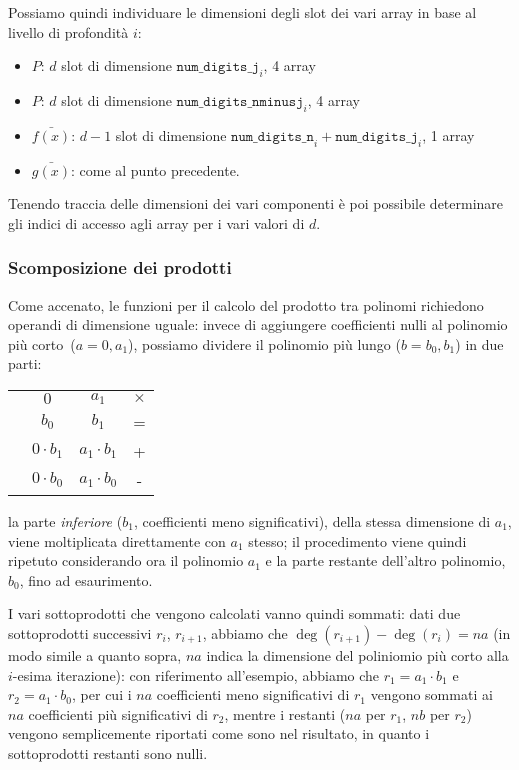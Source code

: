 Possiamo quindi individuare le dimensioni degli slot dei vari array in base al livello di profondità $i$:
\begin{itemize}
        \item $P$: $d$ slot di dimensione $\mathrm{\texttt{num\_digits\_j}}_i$, 4 array
        \item $P$: $d$ slot di dimensione $\mathrm{\texttt{num\_digits\_nminusj}}_i$, 4 array
        \item $\bar{f(x)}$: $d-1$ slot di dimensione $\mathrm{\texttt{num\_digits\_n}}_i + \mathrm{\texttt{num\_digits\_j}}_i$, 1 array
        \item $\bar{g(x)}$: come al punto precedente.
\end{itemize}
Tenendo traccia delle dimensioni dei vari componenti è poi possibile determinare gli indici di accesso agli array per i vari valori di $d$.

\subsubsection*{Scomposizione dei prodotti}

Come accenato, le funzioni per il calcolo del prodotto tra polinomi richiedono operandi di dimensione uguale: invece di aggiungere coefficienti
nulli al polinomio più corto~($a = 0, a_1$), possiamo dividere il polinomio più lungo ($b = b_0, b_1$) in due parti: 
\begin{center}
    \begin{tabular}{cccc}
            & $0$ & $a_1$ & $\times$ \\
            & $b_0$ & $b_1$ & =\\
            \hline
            & $0\cdot b_1$ &$a_1\cdot b_1$ & +\\
            &\hspace{-9ex}$0\cdot b_0$&\hspace{-9ex}$a_1\cdot b_0$&\hspace{-10ex}\--
    \end{tabular}
\end{center}
la parte \textit{inferiore} ($b_{1}$, coefficienti meno significativi),
della stessa dimensione di $a_1$, viene moltiplicata direttamente con $a_1$ stesso; il procedimento viene quindi ripetuto considerando ora il polinomio $a_1$ e 
la parte restante dell'altro polinomio, $b_{0}$, fino ad esaurimento.


I vari sottoprodotti che vengono calcolati vanno quindi sommati: dati due sottoprodotti successivi $r_i$, $r_{i+1}$, abbiamo che $\deg({r_{i+1}})-\deg({r_i}) = na$
(in modo simile a quanto sopra, $na$ indica la dimensione del poliniomio più corto alla $i$-esima iterazione): con riferimento all'esempio, abbiamo che $r_1 = a_1\cdot b_1$ e $r_2 = a_1\cdot b_0$,
per cui i $na$ coefficienti meno significativi di $r_1$ vengono sommati ai $na$ coefficienti più significativi di $r_2$, mentre i restanti ($na$ per $r_1$, $nb$ per $r_2$) vengono semplicemente riportati 
come sono nel risultato, in quanto i sottoprodotti restanti sono nulli.


